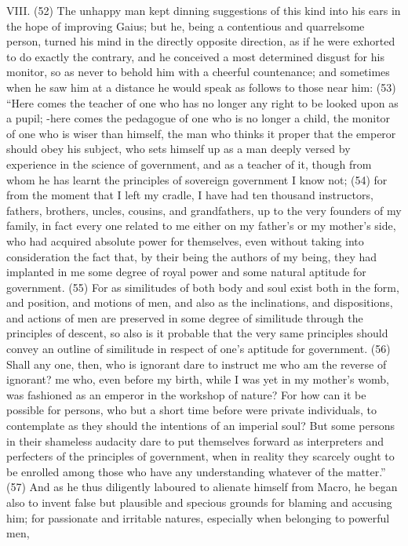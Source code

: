 VIII. (52) The unhappy man kept dinning suggestions of this kind into his ears in the hope of
improving Gaius; but he, being a contentious and quarrelsome person, turned his mind in the
directly opposite direction, as if he were exhorted to do exactly the contrary, and he conceived a
most determined disgust for his monitor, so as never to behold him with a cheerful countenance;
and sometimes when he saw him at a distance he would speak as follows to those near him: (53)
``Here comes the teacher of one who has no longer any right to be looked upon as a pupil; -here
comes the pedagogue of one who is no longer a child, the monitor of one who is wiser than
himself, the man who thinks it proper that the emperor should obey his subject, who sets himself up
as a man deeply versed by experience in the science of government, and as a teacher of it,
though from whom he has learnt the principles of sovereign government I know not; (54) for from
the moment that I left my cradle, I have had ten thousand instructors, fathers, brothers, uncles,
cousins, and grandfathers, up to the very founders of my family, in fact every one related to me
either on my father's or my mother's side, who had acquired absolute power for themselves, even
without taking into consideration the fact that, by their being the authors of my being, they had
implanted in me some degree of royal power and some natural aptitude for government. (55) For
as similitudes of both body and soul exist both in the form, and position, and motions of men, and
also as the inclinations, and dispositions, and actions of men are preserved in some degree of
similitude through the principles of descent, so also is it probable that the very same principles
should convey an outline of similitude in respect of one's aptitude for government. (56) Shall any
one, then, who is ignorant dare to instruct me who am the reverse of ignorant? me who, even
before my birth, while I was yet in my mother's womb, was fashioned as an emperor in the
workshop of nature? For how can it be possible for persons, who but a short time before were
private individuals, to contemplate as they should the intentions of an imperial soul? But some
persons in their shameless audacity dare to put themselves forward as interpreters and perfecters
of the principles of government, when in reality they scarcely ought to be enrolled among those who
have any understanding whatever of the matter.'' (57) And as he thus diligently laboured to alienate
himself from Macro, he began also to invent false but plausible and specious grounds for blaming
and accusing him; for passionate and irritable natures, especially when belonging to powerful men,
